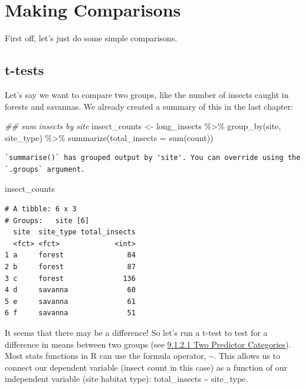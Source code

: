 \documentclass[
  letterpaper,
  DIV=11,
  numbers=noendperiod]{scrreprt}
\newenvironment{Shaded}{\begin{snugshade}}{\end{snugshade}}
\newcommand{\AttributeTok}[1]{\textcolor[rgb]{0.40,0.45,0.13}{#1}}
\newcommand{\DocumentationTok}[1]{\textcolor[rgb]{0.37,0.37,0.37}{\textit{#1}}}
\newcommand{\FunctionTok}[1]{\textcolor[rgb]{0.28,0.35,0.67}{#1}}
\newcommand{\NormalTok}[1]{\textcolor[rgb]{0.00,0.23,0.31}{#1}}
\newcommand{\OtherTok}[1]{\textcolor[rgb]{0.00,0.23,0.31}{#1}}
\newcommand{\SpecialCharTok}[1]{\textcolor[rgb]{0.37,0.37,0.37}{#1}}
\begin{document}
\section{Making Comparisons}\label{making-comparisons}

First off, let's just do some simple comparisons.

\subsection{t-tests}\label{t-tests}

Let's say we want to compare two groups, like the number of insects
caught in forests and savannas. We already created a summary of this in
the last chapter:

\begin{Shaded}
\begin{Highlighting}[]
\DocumentationTok{\#\# sum insects by site}
\NormalTok{insect\_counts }\OtherTok{\textless{}{-}}\NormalTok{ long\_insects }\SpecialCharTok{\%\textgreater{}\%}
  \FunctionTok{group\_by}\NormalTok{(site, site\_type) }\SpecialCharTok{\%\textgreater{}\%}
  \FunctionTok{summarize}\NormalTok{(}\AttributeTok{total\_insects =} \FunctionTok{sum}\NormalTok{(count))}
\end{Highlighting}
\end{Shaded}

\begin{verbatim}
`summarise()` has grouped output by 'site'. You can override using the
`.groups` argument.
\end{verbatim}

\begin{Shaded}
\begin{Highlighting}[]
\NormalTok{insect\_counts}
\end{Highlighting}
\end{Shaded}

\begin{verbatim}
# A tibble: 6 x 3
# Groups:   site [6]
  site  site_type total_insects
  <fct> <fct>             <int>
1 a     forest               84
2 b     forest               87
3 c     forest              136
4 d     savanna              60
5 e     savanna              61
6 f     savanna              51
\end{verbatim}

It seems that there may be a difference! So let's run a t-test to test
for a difference in means between two groups (see
\hyperref[sec-ttest]{9.1.2.1 Two Predictor Categories}). Most stats
functions in R can use the formula operator, \textasciitilde. This
allows us to connect our dependent variable (insect count in this case)
as a function of our independent variable (site habitat type):
total\_insects \textasciitilde{} site\_type.
\end{document}
